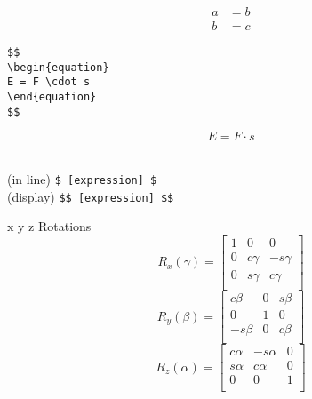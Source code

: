 \documentclass[12pt]{article}
\begin{document}
\begin{multicols}{3}
\begin{latexBox}
\begin{minipage}{1cm}
		\begin{align*}
		a & = b \\
		b & = c
		\end{align*}
	\end{minipage}
	
	
	
	\begin{minipage}{5cm}
		\begin{commandBox}
			\begin{verbatim}
$$
\begin{equation}
E = F \cdot s 
\end{equation}
$$
			\end{verbatim}
		\end{commandBox}
	\end{minipage}
	\begin{minipage}{1cm}
		
\begin{equation}
E = F \cdot s 
\end{equation}
	\end{minipage}\\
(in line) \verb|$ [expression] $| \\
(display) \verb|$$ [expression] $$| \\
\end{latexBox}










\begin{theoryBox}
{x y z Rotations}
$$
R_x(\gamma) = \begin{bmatrix}
1	&	0	&	0	\\
0	&	c\gamma	&	-s\gamma	\\
0	&	s\gamma	&	c\gamma	\\
\end{bmatrix}
$$
$$
R_y(\beta) = \begin{bmatrix}
c\beta	&	0	&	s\beta	\\
0	&	1	&	0	\\
-s\beta	&	0	&	c\beta	\\
\end{bmatrix}
$$
$$
R_z(\alpha) = \begin{bmatrix}
c\alpha	&	-s\alpha	&	0	\\
s\alpha	&	c\alpha	&	0	\\
0	&	0	&	1	\\
\end{bmatrix}
$$
\end{theoryBox}



\end{multicols}
\end{document}
